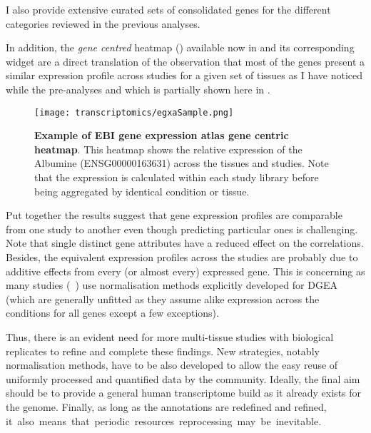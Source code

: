 I also provide extensive curated sets of consolidated genes
for the different categories reviewed in the previous analyses.\mybr\

In addition,
the \emph{gene centred} heatmap () available now
in  and its corresponding widget
are a direct translation of the observation
that most of the genes present a similar expression profile across studies
for a given set of tissues
as I have noticed while the pre-analyses
and which is partially shown here in .\mybr\

\begin{sidewaysfigure}
    \texttt{[image: transcriptomics/egxaSample.png]}\centering
    \caption[Example of EBI gene expression atlas gene centric heatmap]%
    {\label{fig:egxaSample}\textbf{Example of EBI gene expression atlas gene centric heatmap}.
    This heatmap shows the relative expression of the Albumine (ENSG00000163631)
    across the tissues and studies.
    Note that the expression is calculated within each study library before
    being aggregated by identical condition or tissue.}
\end{sidewaysfigure}

Put together the results suggest that
gene expression profiles are comparable from one study to another even though
predicting particular ones is challenging.
Note that single distinct gene attributes have a reduced effect on the correlations.
Besides, the equivalent expression profiles across the studies
are probably due to additive effects from every (or almost every) expressed gene.
This is concerning as many studies (\eg{}~\cite{Sudmant2015-zt})
use normalisation methods explicitly developed for \gls{DGEA}  %
(which are generally unfitted as
they assume alike expression across the conditions for all genes
except a few exceptions).\mybr\

Thus, there is an evident need for more multi-tissue studies
with biological replicates to refine and complete these findings.
New strategies, notably normalisation methods, have to be also developed
to allow the easy reuse of uniformly processed and quantified data by
the community.
Ideally, the final aim should be to provide a general human transcriptome build
as it already exists for the genome.
Finally, as long as the annotations are redefined and refined,
it~also~means~that~periodic~resources~reprocessing~may~be~inevitable.\mybr\


